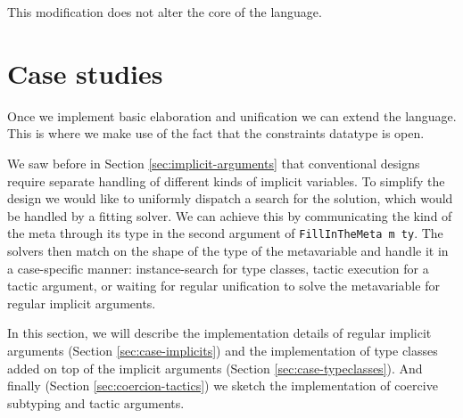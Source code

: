 \begin{imageonly}
\begin{Shaded}
\begin{Highlighting}[]
\NormalTok{ (} \OperatorTok{:\textless{}:}
                      \OtherTok{=\textgreater{}} 
\OtherTok{=}
  \NormalTok{ \{ }
\OtherTok{=}
\OtherTok{=}  \OperatorTok{$} 
\OtherTok{=}\NormalTok{ [ unifyNeutralsDecomposition}
\NormalTok{                 , unificationEndMarkerSymbol]}
\OtherTok{=}\NormalTok{ [unificationStartMarkerSymbol]}
\NormalTok{         \}}
\end{Highlighting}
\end{Shaded}
\end{imageonly}

This modification does not alter the core of the language.

\hypertarget{sec:casestudies}{%
\section{Case studies}\label{sec:casestudies}}

Once we implement basic elaboration and unification we can extend the
language. This is where we make use of the fact that the constraints
datatype is open.

We saw before in Section \ref{sec:implicit-arguments} that conventional
designs require separate handling of different kinds of implicit
variables. To simplify the design we would like to uniformly dispatch a
search for the solution, which would be handled by a fitting solver. We
can achieve this by communicating the kind of the meta through its type
in the second argument of \texttt{FillInTheMeta\ m\ ty}. The solvers
then match on the shape of the type of the metavariable and handle it in
a case-specific manner: instance-search for type classes, tactic
execution for a tactic argument, or waiting for regular unification to
solve the metavariable for regular implicit arguments.

In this section, we will describe the implementation details of regular
implicit arguments (Section \ref{sec:case-implicits}) and the
implementation of type classes added on top of the implicit arguments
(Section \ref{sec:case-typeclasses}). And finally (Section
\ref{sec:coercion-tactics}) we sketch the implementation of coercive
subtyping and tactic arguments.

